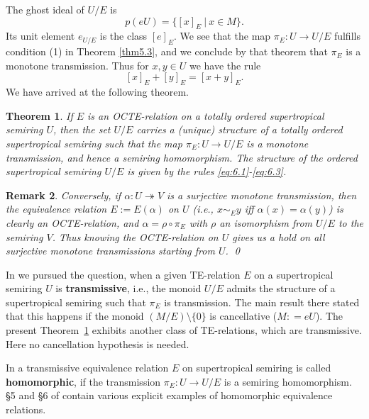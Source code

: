 \documentclass [12pt,a4paper,reqno]{amsart}
\newtheorem{thm}{Theorem} [section]
\newtheorem{rem}[thm]{Remark}
\begin{document}
The ghost ideal of $U/E$ is
$$ p(eU) = \{ [x]_E {\ {|} \ } x \in M \}.$$
Its unit element $e_{U/E}$ is the class $[e]_E$. We see that the
map $\pi_E: U \to U/E$ fulfills condition (1) in Theorem
\ref{thm5.3}, and we  conclude by that theorem that $\pi_E$ is a
monotone transmission. Thus for $x,y \in U$ we have the rule
\begin{equation}\label{eq:6.3}
    [x]_E + [y]_E = [x+y]_E.
\end{equation}
We have arrived at the following theorem.
\begin{thm}\label{thm6.2}
If $E$ is an OCTE-relation on a totally ordered supertropical
semiring $U$, then the set $U/E$ carries a (unique) structure of a
totally ordered supertropical semiring such that the map $\pi_E: U
\to U/E$ is a monotone transmission, and hence a semiring
homomorphism. The structure of the  ordered supertropical semiring
$U/E$ is given by the rules \eqref{eq:6.1}-\eqref{eq:6.3}.
\end{thm}

\begin{rem} Conversely, if ${\alpha}: U {\twoheadrightarrow} V$ is a surjective monotone
transmission, then the equivalence relation $E := E({\alpha})$ on $U$
(i.e., $x \sim_E y$ iff ${\alpha}(x) = {\alpha}(y)$) is clearly an
OCTE-relation, and ${\alpha} = \rho \circ \pi_E$ with $\rho$ an
isomorphism from  $U/E$ to the semiring $V$. Thus knowing the
OCTE-relation on $U$ gives us a hold on all  surjective monotone
transmissions starting from $U$. { \hfill\quad\qed}
\end{rem}

In \cite[\S4]{IKR2} we pursued the question, when a given
TE-relation $E$ on a supertropical semiring $U$ is
\textbf{transmissive}, i.e., the monoid $U/E$ admits the structure
of a supertropical semiring such that $\pi_E$ is  transmission.
The main result there \cite[Theorem 4.7]{IKR2} stated that this
happens if the monoid $(M/E) {\setminus} \{0\}$ is cancellative ($M: =
eU$). The present Theorem~\ref{thm6.2} exhibits another class of
TE-relations, which are transmissive. Here no cancellation
hypothesis is needed.

{\vskip 1.5mm \noindent}

 In \cite{IKR2} a transmissive equivalence relation $E$ on
supertropical semiring is called \textbf{homomorphic}, if the
transmission $\pi_E: U \to U/E$ is a semiring homomorphism. \S5
and \S6 of \cite{IKR2} contain various explicit examples of
homomorphic equivalence relations.
\end{document}
